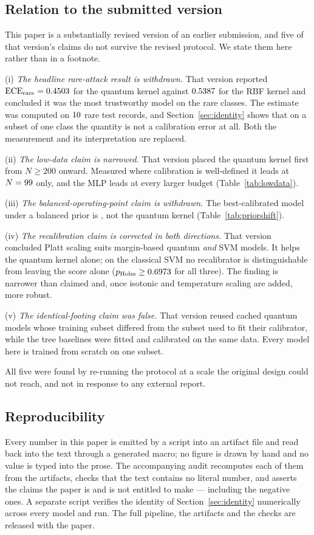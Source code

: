 \documentclass[journal]{IEEEtran}
\begin{document}
\subsection*{Relation to the submitted version}
This paper is a substantially revised version of an earlier submission, and
five of that version's claims do not survive the revised protocol. We state
them here rather than in a footnote.

(i) \emph{The headline rare-attack result is withdrawn.} That version
reported $\mathrm{ECE}_{\text{rare}}=0.4503$ for the quantum kernel
against $0.5387$ for the RBF kernel and concluded it was the most
trustworthy model on the rare classes. The estimate was computed on
$10$ rare test records, and
Section~\ref{sec:identity} shows that on a subset of one class the quantity
is not a calibration error at all. Both the measurement and its
interpretation are replaced.

(ii) \emph{The low-data claim is narrowed.} That version placed the quantum
kernel first from $N\geq200$ onward. Measured where calibration is
well-defined it leads at $N=99$ only, and the MLP leads at every
larger budget (Table~\ref{tab:lowdata}).

(iii) \emph{The balanced-operating-point claim is withdrawn.} The
best-calibrated model under a balanced prior is \ppsBalWinner{}, not the
quantum kernel (Table~\ref{tab:priorshift}).

(iv) \emph{The recalibration claim is corrected in both directions.} That
version concluded Platt scaling suits margin-based quantum \emph{and} SVM
models. It helps the quantum kernel alone; on the classical SVM no
recalibrator is distinguishable from leaving the score alone
($p_{\text{Holm}}\geq0.6973$ for all three). The
finding is narrower than claimed and, once isotonic and temperature scaling
are added, more robust.

(v) \emph{The identical-footing claim was false.} That version reused cached
quantum models whose training subset differed from the subset used to fit
their calibrator, while the tree baselines were fitted and calibrated on the
same data. Every model here is trained from scratch on one subset.

All five were found by re-running the protocol at a scale the original
design could not reach, and not in response to any external report.

\subsection*{Reproducibility}
Every number in this paper is emitted by a script into an artifact file and
read back into the text through a generated macro; no figure is drawn by
hand and no value is typed into the prose. The accompanying audit
recomputes each of them from the artifacts, checks that the text contains no
literal number, and asserts the claims the paper is and is not entitled to
make --- including the negative ones. A separate script verifies the
identity of Section~\ref{sec:identity} numerically across every model and
run. The full pipeline, the artifacts and the checks are released with the
paper.
\end{document}
